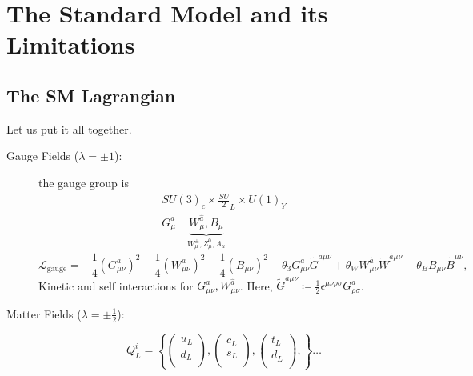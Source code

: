 
\chapter{The Standard Model and its Limitations}%
\label{cha:the_standard_model_and_its_limitations}

\section{The SM Lagrangian}%
\label{sec:the_sm_lagrangian}

Let us put it all together.
\begin{description}
  \item[Gauge Fields ($\lambda = \pm 1$):] the gauge group is
    \begin{equation}
      \begin{gathered}
	SU(3)_c \times \frac{SU}{2}_L \times U(1)_Y \\
	G_{\mu}^{a} \quad \underbrace{W_{\mu}^{\hat{a}}, B_{\mu}}_{W_{\mu}^{\pm}, Z_\mu^0, A_\mu}
      \end{gathered}
    \end{equation}
    \begin{equation}
      \mathscr{L}_{\text{gauge}} = -\frac{1}{4} (G^{a}_{\mu\nu})^2 -\frac{1}{4} (W^{a}_{\mu\nu})^2 - \frac{1}{4} (B_{\mu\nu})^2 + \theta_3 G^{a}_{\mu\nu} \widetilde{G}^{a \mu\nu} + \theta_{W} W^{\hat{a}}_{\mu\nu} \widetilde{W}^{\hat{a} \mu \nu} - \theta_{B} B_{\mu\nu} \widetilde{B}^{\mu\nu},
    \end{equation}
    Kinetic and self interactions for $G^{a}_{\mu\nu}, W^{\hat{a}}_{\mu\nu}$.
    Here, $\widetilde{G}^{a \mu \nu} \coloneqq \frac{1}{2} \epsilon^{\mu\nu\rho\sigma} G^{a}_{\rho\sigma}$.
  \item[Matter Fields ($\lambda = \pm \frac{1}{2}$):]
    \begin{equation}
      Q_L^{i} = \left\{
      \begin{pmatrix}
	u_L \\
	d_L \\
      \end{pmatrix}, 
      \begin{pmatrix}
	c_L \\
	s_L \\
      \end{pmatrix}, 
      \begin{pmatrix}
	t_L \\
	d_L \\
      \end{pmatrix}, 
      \right\} \dots
    \end{equation}


\end{description}
